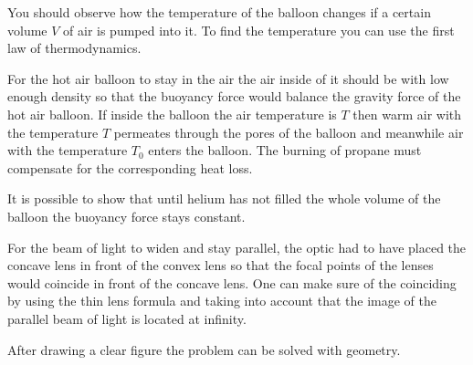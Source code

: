 \documentclass[11pt]{article}
\begin{document}

\hinteng
You should observe how the temperature of the balloon changes if a certain volume $V$ of air is pumped into it. To find the temperature you can use the first law of thermodynamics.
\probend
\bigskip


\hinteng
For the hot air balloon to stay in the air the air inside of it should be with low enough density so that the buoyancy force would balance the gravity force of the hot air balloon. If inside the balloon the air temperature is $T$ then warm air with the temperature $T$ permeates through the pores of the balloon and meanwhile air with the temperature $T_0$ enters the balloon. The burning of propane must compensate for the corresponding heat loss.
\probend
\bigskip


\hinteng
It is possible to show that until helium has not filled the whole volume of the balloon the buoyancy force stays constant.
\probend
\bigskip


\hinteng
For the beam of light to widen and stay parallel, the optic had to have placed the concave lens in front of the convex lens so that the focal points of the lenses would coincide in front of the concave lens. One can make sure of the coinciding by using the thin lens formula and taking into account that the image of the parallel beam of light is located at infinity.
\probend
\bigskip


\hinteng
After drawing a clear figure the problem can be solved with geometry.
\probend
\bigskip

\end{document}
